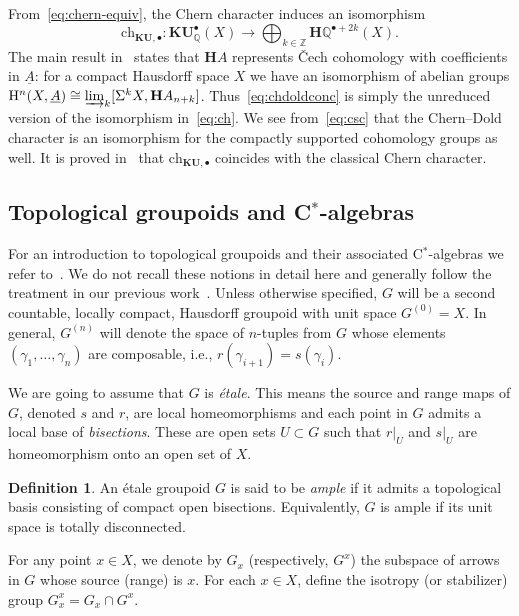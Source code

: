 \documentclass[a4paper,reqno]{amsart}
\theoremstyle{plain}
\theoremstyle{definition}
\newtheorem{definition}[theorem]{Definition}
\theoremstyle{remark}
\numberwithin{equation}{section}
\newcommand{\rH}{\mathrm{H}}
\newcommand{\dQ}{\mathbb{Q}}
\newcommand{\dZ}{\mathbb{Z}}
\newcommand{\bH}{\mathbf{H}}
\newcommand{\ch}{\mathrm{ch}}
\newcommand{\KU}{\mathbf{KU}}
\begin{document}
From~\eqref{eq:chern-equiv}, the Chern character induces an isomorphism
\begin{equation}\label{eq:chdoldconc}
\ch_{\KU,\bullet}\colon\KU_\dQ^\bullet(X)\to \bigoplus_{k \in \dZ} \bH\dQ^{\bullet + 2 k}(X).
\end{equation} 
The main result in~\cite{huber:cechcoh} states that $\bH A$ represents Čech cohomology with coefficients in $\underline{A}$: for a compact Hausdorff space $X$ we have an isomorphism of abelian groups $\rH^n(X,\underline{A})\cong \varinjlim_k [\Sigma^k X, \bH A_{n+k}]$. Thus~\eqref{eq:chdoldconc} is simply the unreduced version of the isomorphism in~\eqref{eq:ch}. We see from~\eqref{eq:csc} that the Chern--Dold character is an isomorphism for the compactly supported cohomology groups as well. It is proved in~\cite{dold:ch} that $\ch_{\KU,\bullet}$ coincides with the classical Chern character.

\subsection{Topological groupoids and C\texorpdfstring{$^*$}{*}-algebras}\label{sec:grpds-c-star-algs}

For an introduction to topological groupoids and their associated C$^*$-algebras we refer to~\cites{ren:group,dw:toolkit}. We do not recall these notions in detail here and generally follow the treatment in our previous work~\cite{py:part-one}. Unless otherwise specified, $G$ will be a second countable, locally compact, Hausdorff groupoid with unit space $G^{(0)}=X$. In general, $G^{(n)}$ will denote the space of $n$-tuples from $G$ whose elements $(\gamma_1,\dots,\gamma_n)$ are composable, i.e., $r(\gamma_{i+1})=s(\gamma_{i})$.

We are going to assume that $G$ is \emph{étale}. This means the source and range maps of $G$, denoted $s$ and $r$, are local homeomorphisms and each point in $G$ admits a local base of \emph{bisections}.
These are open sets $U\subset G$ such that $r|_U$ and $s|_U$ are homeomorphism onto an open set of $X$.

\begin{definition}
An étale groupoid $G$ is said to be \emph{ample} if it admits a topological basis consisting of compact open bisections.
Equivalently, $G$ is ample if its unit space is totally disconnected.
\end{definition}

For any point $x\in X$, we denote by $G_x$ (respectively, $G^x$) the subspace of arrows in $G$ whose source (range) is $x$. For each $x\in X$, define the isotropy (or stabilizer) group $G^x_x = G_x\cap G^x$.
\end{document}
